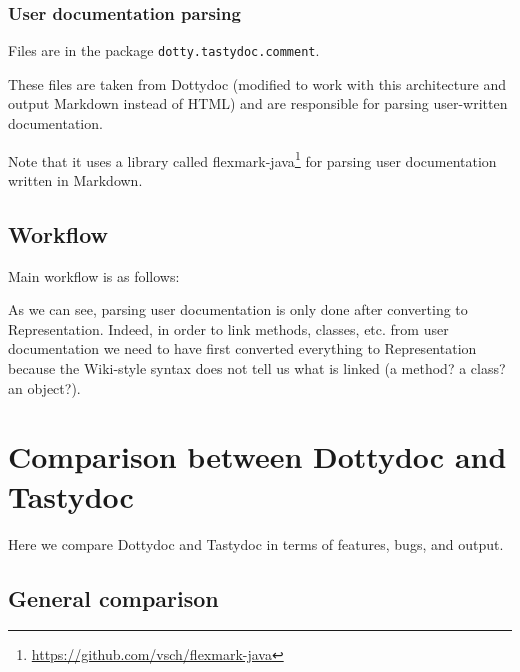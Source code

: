 \documentclass{report}
\begin{document}
\subsection{User documentation parsing}
Files are in the package \texttt{dotty.tastydoc.comment}.

These files are taken from Dottydoc (modified to work with this architecture and output Markdown instead of HTML) and are responsible for parsing user-written documentation.

Note that it uses a library called flexmark-java\footnote{\url{https://github.com/vsch/flexmark-java}} for parsing user documentation written in Markdown.

\section{Workflow}
\label{sec:workflow}
Main workflow is as follows:

\begin{center}
\end{center}

As we can see, parsing user documentation is only done after converting to Representation. Indeed, in order to link methods, classes, etc. from user documentation we need to have first converted everything to Representation because the Wiki-style syntax does not tell us what is linked (a method? a class? an object?).


\chapter{Comparison between Dottydoc and Tastydoc}
Here we compare Dottydoc and Tastydoc in terms of features, bugs, and output.

\section{General comparison}
\label{sec:comparison}
\end{document}
